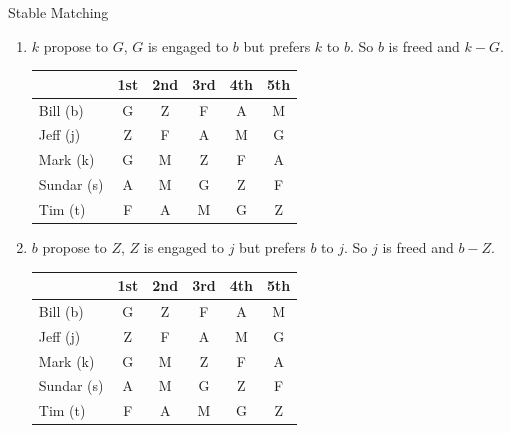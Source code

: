 \documentclass{article}
\numberwithin{table}{section}
\numberwithin{figure}{section}
\begin{document}
\begin{section}{Stable Matching}
\begin{enumerate} [(A)]
\begin{enumerate}[(1)]
\begin{tcolorbox}[breakable]
\begin{enumerate}[(1)]
                    \item $k$ propose to $G$, $G$ is engaged to $b$ but prefers $k$ to $b$. So $b$ is freed and $k-G$.
                    \begin{table}[H]
                        \centering
                        \begin{tabular}{|m{2.5cm}|*{5}{c|}}
                            \hline
                            & 1st & 2nd & 3rd & 4th & 5th \\
                            \hline
                            Bill (b)        & {\color{blue} G} & Z & F & A & M \\
                            Jeff (j)        & {\color{red} Z} & F & A & M & G \\
                            Mark (k)        & {\color{red} G} & M & Z & F & A \\
                            Sundar (s)      & A & M & G & Z & F \\
                            Tim (t)         & F & A & M & G & Z \\
                            \hline                            
                        \end{tabular}
                    \end{table}

                    \item $b$ propose to $Z$, $Z$ is engaged to $j$ but prefers $b$ to $j$. So $j$ is freed and $b-Z$.
                    \begin{table}[H]
                        \centering
                        \begin{tabular}{|m{2.5cm}|*{5}{c|}}
                            \hline
                            & 1st & 2nd & 3rd & 4th & 5th \\
                            \hline
                            Bill (b)        & {\color{blue} G} & {\color{red} Z} & F & A & M \\
                            Jeff (j)        & {\color{blue} Z} & F & A & M & G \\
                            Mark (k)        & {\color{red} G} & M & Z & F & A \\
                            Sundar (s)      & A & M & G & Z & F \\
                            Tim (t)         & F & A & M & G & Z \\
                            \hline                            
                        \end{tabular}
                    \end{table}


\end{enumerate}
\end{tcolorbox}
\end{enumerate}
\end{enumerate}
\end{section}
\end{document}

